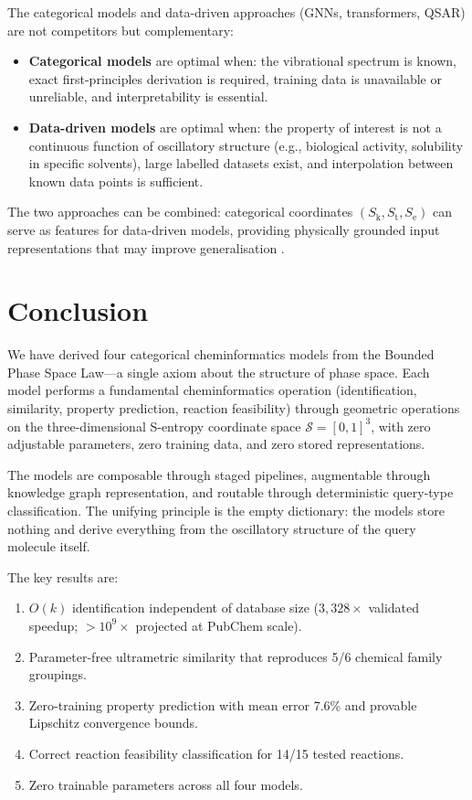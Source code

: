 \documentclass[11pt,twocolumn,a4paper]{article}
\theoremstyle{definition}
\theoremstyle{remark}
\newcommand{\Sk}{S_{\mathrm{k}}}
\newcommand{\St}{S_{\mathrm{t}}}
\newcommand{\Se}{S_{\mathrm{e}}}
\newcommand{\Sspace}{\mathcal{S}}
\begin{document}
The categorical models and data-driven approaches (GNNs, transformers, QSAR) are not competitors but complementary:

\begin{itemize}[nosep]
\item \textbf{Categorical models} are optimal when: the vibrational spectrum is known, exact first-principles derivation is required, training data is unavailable or unreliable, and interpretability is essential.

\item \textbf{Data-driven models} are optimal when: the property of interest is not a continuous function of oscillatory structure (e.g., biological activity, solubility in specific solvents), large labelled datasets exist, and interpolation between known data points is sufficient.
\end{itemize}

The two approaches can be combined: categorical coordinates $(\Sk, \St, \Se)$ can serve as features for data-driven models, providing physically grounded input representations that may improve generalisation \citep{duvenaud2015}.


\section{Conclusion}
\label{sec:conclusion}

We have derived four categorical cheminformatics models from the Bounded Phase Space Law---a single axiom about the structure of phase space. Each model performs a fundamental cheminformatics operation (identification, similarity, property prediction, reaction feasibility) through geometric operations on the three-dimensional S-entropy coordinate space $\Sspace = [0,1]^3$, with zero adjustable parameters, zero training data, and zero stored representations.

The models are composable through staged pipelines, augmentable through knowledge graph representation, and routable through deterministic query-type classification. The unifying principle is the empty dictionary: the models store nothing and derive everything from the oscillatory structure of the query molecule itself.

The key results are:
\begin{enumerate}[nosep]
\item $O(k)$ identification independent of database size ($3{,}328\times$ validated speedup; $>10^9\times$ projected at PubChem scale).
\item Parameter-free ultrametric similarity that reproduces 5/6 chemical family groupings.
\item Zero-training property prediction with mean error 7.6\% and provable Lipschitz convergence bounds.
\item Correct reaction feasibility classification for 14/15 tested reactions.
\item Zero trainable parameters across all four models.
\end{enumerate}
\end{document}
